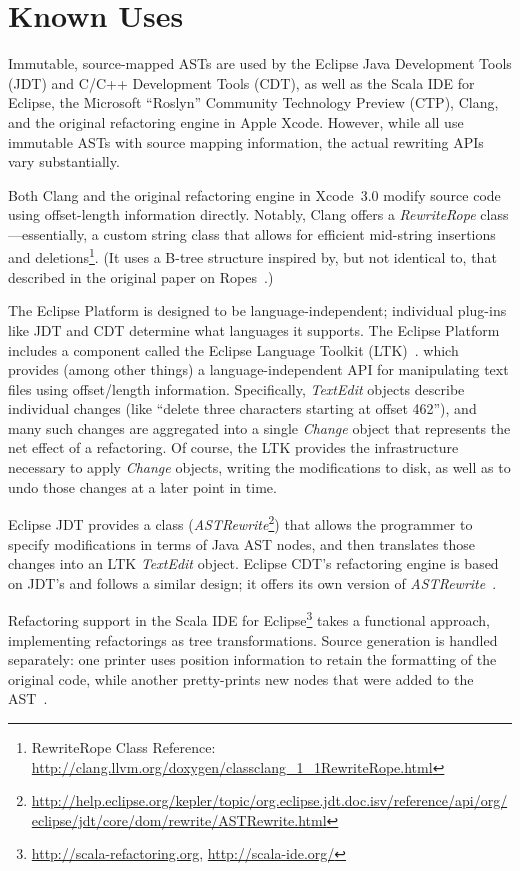 \documentclass[prodmode]{acmlarge}
\begin{document}
\section{Known Uses}

Immutable, source-mapped ASTs are used by the Eclipse Java Development Tools
(JDT) and C/C++ Development Tools (CDT), as well as the Scala IDE for Eclipse,
the Microsoft ``Roslyn'' Community Technology Preview (CTP), Clang, and the
original refactoring engine in Apple Xcode.  However, while all use immutable
ASTs with source mapping information, the actual rewriting APIs vary
substantially.  

Both Clang and the original refactoring engine in Xcode~3.0 modify source code
using offset-length information directly.  Notably, Clang offers a
\textit{RewriteRope} class---essentially, a custom string class that allows for
efficient mid-string insertions and
deletions\footnote{RewriteRope Class Reference: \url{http://clang.llvm.org/doxygen/classclang_1_1RewriteRope.html}}.
(It uses a B-tree structure inspired by, but not identical to, that described
in the original paper on Ropes~\cite{boehm95ropes}.)
 
The Eclipse Platform is designed to be language-independent; individual
plug-ins like JDT and CDT determine what languages it supports.  The Eclipse
Platform includes a component called the Eclipse Language Toolkit
(LTK)~\cite{ltk}.  which provides (among other things) a language-independent
API for manipulating text files using offset/length information.  Specifically,
\textit{TextEdit} objects describe individual changes (like ``delete three
characters starting at offset 462''), and many such changes are aggregated into
a single \textit{Change} object that represents the net effect of a
refactoring.  Of course, the LTK provides the infrastructure necessary to apply
\textit{Change} objects, writing the modifications to disk, as well as to undo
those changes at a later point in time.

Eclipse JDT provides a class (\textit{ASTRewrite}\footnote{\url{http://help.eclipse.org/kepler/topic/org.eclipse.jdt.doc.isv/reference/api/org/eclipse/jdt/core/dom/rewrite/ASTRewrite.html}}) that allows the programmer
to specify modifications in terms of Java AST nodes, and then translates those
changes into an LTK \textit{TextEdit} object.  Eclipse CDT's refactoring engine
is based on JDT's and follows a similar design; it offers its own version of
\textit{ASTRewrite}~\cite{cdt-refactoring}.

Refactoring support in the Scala IDE for
Eclipse\footnote{\url{http://scala-refactoring.org},
\url{http://scala-ide.org/}} takes a functional approach, implementing
refactorings as tree transformations.  Source generation is handled separately:
one printer uses position information to retain the formatting of the original
code, while another pretty-prints new nodes that were added to the
AST~\cite{stocker10scala}.
\end{document}
